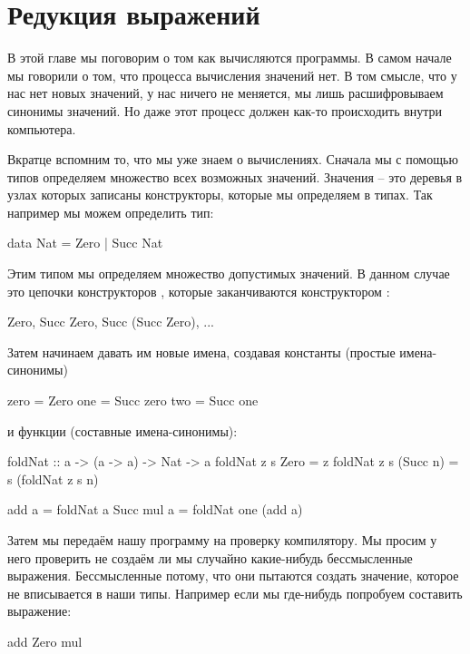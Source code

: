 \setcounter{chapter}{8}
\chapter{Редукция выражений}

В этой главе мы поговорим о том как вычисляются программы. 
В самом начале мы говорили о том, что 
процесса вычисления значений нет. В том смысле, что у нас
нет новых значений, у нас ничего не меняется, мы лишь
расшифровываем синонимы значений. Но даже этот процесс
должен как-то происходить внутри компьютера. 

Вкратце вспомним то, что мы уже знаем о вычислениях.
Сначала мы с помощью типов определяем
множество всех возможных значений. Значения -- это деревья
в узлах которых записаны конструкторы, которые мы 
определяем в типах. Так например мы можем определить тип:

\begin{code}
data Nat = Zero | Succ Nat
\end{code}

Этим типом мы определяем множество допустимых значений. 
В данном случае это цепочки конструкторов ,
которые заканчиваются конструктором :

\begin{code}
Zero, Succ Zero, Succ (Succ Zero), ...
\end{code}
    
Затем начинаем давать им
новые имена, создавая константы (простые имена-синонимы) 
  
\begin{code}
zero    = Zero
one     = Succ zero
two     = Succ one
\end{code}


\noindent и функции (составные имена-синонимы):

\begin{code}
foldNat :: a -> (a -> a) -> Nat -> a
foldNat z  s  Zero      = z
foldNat z  s  (Succ n)  = s (foldNat z s n)

add a = foldNat a   Succ
mul a = foldNat one (add a) 
\end{code}

Затем мы передаём нашу программу на проверку компилятору. 
Мы просим у него проверить не создаём ли мы случайно 
какие-нибудь бессмысленные
выражения. Бессмысленные потому, что они пытаются 
создать значение, которое не вписывается в наши типы.
Например если мы где-нибудь попробуем составить выражение:

\begin{code}
add Zero mul
\end{code}

